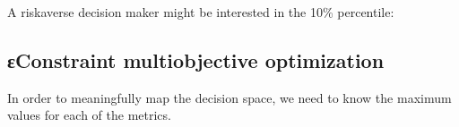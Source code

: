 \documentclass[letterpaper,10pt,english]{sphinxmanual}
\begin{document}
\begin{sphinxVerbatim}[commandchars=\\\{\}]
       
      
    
   
\end{sphinxVerbatim}

\sphinxAtStartPar
A risk\sphinxhyphen{}averse decision maker might be interested in the 10\% percentile:

\begin{sphinxVerbatim}[commandchars=\\\{\}]
    
\end{sphinxVerbatim}

\begin{sphinxVerbatim}[commandchars=\\\{\}]
       
       
   
   
\end{sphinxVerbatim}


\subsection{ε\sphinxhyphen{}Constraint multiobjective optimization}
\label{\detokenize{example-analysis:constraint-multiobjective-optimization}}
\begin{sphinxVerbatim}[commandchars=\\\{\}]
  
\end{sphinxVerbatim}

\sphinxAtStartPar
In order to meaningfully map the decision space, we need to know the
maximum values for each of the metrics.

\begin{sphinxVerbatim}[commandchars=\\\{\}]
  
\end{sphinxVerbatim}
\end{document}
